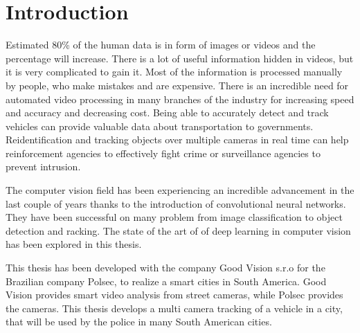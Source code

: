 \documentclass[a4paper,12pt,titlepage, twoside]{article}
\numberwithin{figure}{section}
\begin{document}

\pagestyle{empty}
\cleardoublepage


\cleardoublepage


\cleardoublepage


\cleardoublepage



\cleardoublepage

\pagestyle{fancy}
\cfoot{\thepage}

\tableofcontents
\cleardoublepage

\listoffigures
\cleardoublepage

\pagestyle{fancy}
\cfoot{}
\rfoot{\thepage$/$\pageref{LastPage}}
\setlength{\parskip}{0.35cm}

\lhead{\emph{\leftmark}}
\rhead{}

\section{Introduction}
Estimated 80\% of the human data is in form of images or videos \cite{cisco} and the percentage will increase. There is a lot of useful information hidden in videos, but it is very complicated to gain it. Most of the information is processed manually by people, who make mistakes and are expensive. There is an incredible need for automated video processing in many branches of the industry for increasing speed and accuracy and decreasing cost. Being able to accurately detect and track vehicles can provide valuable data about transportation to governments. Reidentification and tracking objects over multiple cameras in real time can help reinforcement agencies to effectively fight crime or surveillance agencies to prevent intrusion. 

The computer vision field has been experiencing an incredible advancement in the last couple of years thanks to the introduction of convolutional neural networks. They have been successful on many problem from image classification to object detection and racking. The state of the art of of deep learning in computer vision has been explored in this thesis.

This thesis has been developed with the company Good Vision s.r.o for the Brazilian company Polsec, to realize a smart cities in South America. Good Vision provides smart video analysis from street cameras, while Polsec provides the cameras. This thesis develops a multi camera tracking of a vehicle in a city, that will be used by the police in many South American cities. 
\end{document}
